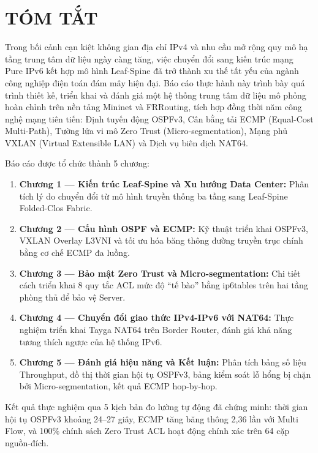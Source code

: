 \section*{TÓM TẮT}

Trong bối cảnh cạn kiệt không gian địa chỉ IPv4 và nhu cầu mở rộng quy mô hạ tầng trung tâm dữ liệu ngày càng tăng, việc chuyển đổi sang kiến trúc mạng Pure IPv6 kết hợp mô hình Leaf-Spine đã trở thành xu thế tất yếu của ngành công nghiệp điện toán đám mây hiện đại. Báo cáo thực hành này trình bày quá trình thiết kế, triển khai và đánh giá một hệ thống trung tâm dữ liệu mô phỏng hoàn chỉnh trên nền tảng Mininet và FRRouting, tích hợp đồng thời năm công nghệ mạng tiên tiến: Định tuyến động OSPFv3, Cân bằng tải ECMP (Equal-Cost Multi-Path), Tường lửa vi mô Zero Trust (Micro-segmentation), Mạng phủ VXLAN (Virtual Extensible LAN) và Dịch vụ biên dịch NAT64.

Báo cáo được tổ chức thành 5 chương:
\begin{enumerate}
    \item \textbf{Chương 1 — Kiến trúc Leaf-Spine và Xu hướng Data Center:} Phân tích lý do chuyển đổi từ mô hình truyền thống ba tầng sang Leaf-Spine Folded-Clos Fabric.
    \item \textbf{Chương 2 — Cấu hình OSPF và ECMP:} Kỹ thuật triển khai OSPFv3, VXLAN Overlay L3VNI và tối ưu hóa băng thông đường truyền trục chính bằng cơ chế ECMP đa luồng.
    \item \textbf{Chương 3 — Bảo mật Zero Trust và Micro-segmentation:} Chi tiết cách triển khai 8 quy tắc ACL mức độ ``tế bào'' bằng ip6tables trên hai tầng phòng thủ để bảo vệ Server.
    \item \textbf{Chương 4 — Chuyển đổi giao thức IPv4-IPv6 với NAT64:} Thực nghiệm triển khai Tayga NAT64 trên Border Router, đánh giá khả năng tương thích ngược của hệ thống IPv6.
    \item \textbf{Chương 5 — Đánh giá hiệu năng và Kết luận:} Phân tích bảng số liệu Throughput, đồ thị thời gian hội tụ OSPFv3, bảng kiểm soát lỗ hổng bị chặn bởi Micro-segmentation, kết quả ECMP hop-by-hop.
\end{enumerate}

Kết quả thực nghiệm qua 5 kịch bản đo lường tự động đã chứng minh: thời gian hội tụ OSPFv3 khoảng 24--27 giây, ECMP tăng băng thông 2,36 lần với Multi Flow, và 100\% chính sách Zero Trust ACL hoạt động chính xác trên 64 cặp nguồn-đích.

\newpage
